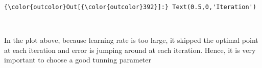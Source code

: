 \documentclass[11pt]{article}
\begin{document}
\begin{Verbatim}[commandchars=\\\{\}]
{\color{outcolor}Out[{\color{outcolor}392}]:} Text(0.5,0,'Iteration')
\end{Verbatim}
            
    \begin{center}
    \end{center}
    { \hspace*{\fill} \\}
    
    In the plot above, because learning rate is too large, it skipped the
optimal point at each iteration and error is jumping around at each
iteration. Hence, it is very important to choose a good tunning
parameter


    
    
    
    
\end{document}
